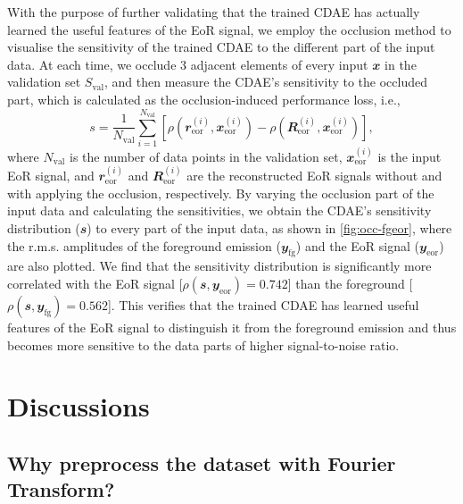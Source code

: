 \documentclass[fleqn,usenatbib]{mnras}
\newcommand{\R}[1]{\mathrm{#1}}
\newcommand{\B}[1]{\mathbfit{#1}}
\begin{document}
{With the purpose of further validating that the trained CDAE has actually
learned the useful features of the EoR signal, we employ the occlusion
method \citep{zeiler2014} to visualise the sensitivity of the trained CDAE
to the different part of the input data.
At each time, we occlude 3 adjacent elements of every input
$\B{x}$ in the validation set $S_{\R{val}}$, and then measure the CDAE's
sensitivity to the occluded part, which is calculated as the
occlusion-induced performance loss, i.e.,
\begin{equation}
  \label{eq:perf-loss}
  s = \frac{1}{N_{\R{val}}} \sum_{i=1}^{N_{\R{val}}}
    \left[ \rho\left(\B{r}^{(i)}_{\R{eor}}, \B{x}^{(i)}_{\R{eor}}\right) -
      \rho\left(\B{R}^{(i)}_{\R{eor}}, \B{x}^{(i)}_{\R{eor}}\right) \right],
\end{equation}
where
$N_{\R{val}}$ is the number of data points in the validation set,
$\B{x}^{(i)}_{\R{eor}}$ is the input EoR signal, and
$\B{r}^{(i)}_{\R{eor}}$ and $\B{R}^{(i)}_{\R{eor}}$ are the reconstructed
EoR signals without and with applying the occlusion, respectively.
By varying the occlusion part of the input data and calculating the
sensitivities, we obtain the CDAE's sensitivity distribution ($\B{s}$) to
every part of the input data, as shown in \autoref{fig:occ-fgeor}, where
the r.m.s\@. amplitudes of the foreground emission ($\B{y}_{\R{fg}}$) and
the EoR signal ($\B{y}_{\R{eor}}$) are also plotted.
We find that the sensitivity distribution is significantly more correlated
with the EoR signal [$\rho(\B{s}, \B{y}_{\R{eor}}) = 0.742$] than the
foreground [$\rho(\B{s}, \B{y}_{\R{fg}}) = 0.562$].
This verifies that the trained CDAE has learned useful features of the EoR
signal to distinguish it from the foreground emission and thus becomes more
sensitive to the data parts of higher signal-to-noise ratio.
} %


\section{Discussions}
\label{sec:discussions}

\subsection{Why preprocess the dataset with Fourier Transform?}
\label{sec:why-ft}
\end{document}
